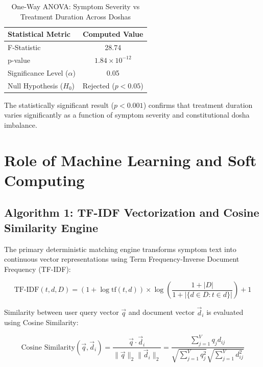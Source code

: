 \documentclass[12pt,a4paper]{article}
\begin{document}
\begin{table}[H]
\centering
\caption{One-Way ANOVA: Symptom Severity vs Treatment Duration Across Doshas}
\label{tab:anovadiag}
\begin{tabular}{|l|c|}
\hline
\textbf{Statistical Metric} & \textbf{Computed Value} \\
\hline
F-Statistic & 28.74 \\
p-value & $1.84 \times 10^{-12}$ \\
Significance Level ($\alpha$) & 0.05 \\
Null Hypothesis ($H_0$) & Rejected ($p < 0.05$) \\
\hline
\end{tabular}
\end{table}

The statistically significant result ($p < 0.001$) confirms that treatment duration varies significantly as a function of symptom severity and constitutional dosha imbalance.

\newpage
\section{Role of Machine Learning and Soft Computing}

\subsection{Algorithm 1: TF-IDF Vectorization and Cosine Similarity Engine}
The primary deterministic matching engine transforms symptom text into continuous vector representations using Term Frequency-Inverse Document Frequency (TF-IDF):

\begin{equation}
\text{TF-IDF}(t, d, D) = (1 + \log \text{tf}(t, d)) \times \log\left(\frac{1 + |D|}{1 + |\{d \in D : t \in d\}|}\right) + 1
\end{equation}

Similarity between user query vector $\vec{q}$ and document vector $\vec{d}_i$ is evaluated using Cosine Similarity:

\begin{equation}
\text{Cosine Similarity}(\vec{q}, \vec{d}_i) = \frac{\vec{q} \cdot \vec{d}_i}{\|\vec{q}\|_2 \|\vec{d}_i\|_2} = \frac{\sum_{j=1}^{V} q_j d_{ij}}{\sqrt{\sum_{j=1}^{V} q_j^2} \sqrt{\sum_{j=1}^{V} d_{ij}^2}}
\end{equation}
\end{document}
